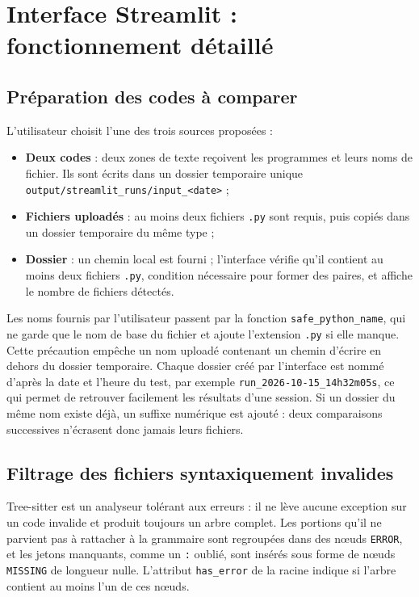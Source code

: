 \documentclass[12pt,a4paper,oneside]{report}
\begin{document}
\chapter{Interface Streamlit : fonctionnement détaillé}
\label{chap:streamlit}

\section{Préparation des codes à comparer}

L'utilisateur choisit l'une des trois sources proposées :
\begin{itemize}
  \item \textbf{Deux codes} : deux zones de texte reçoivent les programmes et
        leurs noms de fichier. Ils sont écrits dans un dossier temporaire
        unique \texttt{output/streamlit\_runs/input\_<date>} ;
  \item \textbf{Fichiers uploadés} : au moins deux fichiers \texttt{.py} sont
        requis, puis copiés dans un dossier temporaire du même type ;
  \item \textbf{Dossier} : un chemin local est fourni ; l'interface vérifie
        qu'il contient au moins deux fichiers \texttt{.py}, condition
        nécessaire pour former des paires, et affiche le nombre de fichiers
        détectés.
\end{itemize}

Les noms fournis par l'utilisateur passent par la fonction
\texttt{safe\_python\_name}, qui ne garde que le nom de base du fichier et
ajoute l'extension \texttt{.py} si elle manque. Cette précaution empêche un nom
uploadé contenant un chemin d'écrire en dehors du dossier temporaire.
Chaque dossier créé par l'interface est nommé d'après la date et l'heure du
test, par exemple \texttt{run\_2026-10-15\_14h32m05s}, ce qui permet de
retrouver facilement les résultats d'une session. Si un dossier du même nom
existe déjà, un suffixe numérique est ajouté : deux comparaisons successives
n'écrasent donc jamais leurs fichiers.

\section{Filtrage des fichiers syntaxiquement invalides}
\label{sec:filtrage}

Tree-sitter est un analyseur tolérant aux erreurs : il ne lève aucune
exception sur un code invalide et produit toujours un arbre complet. Les
portions qu'il ne parvient pas à rattacher à la grammaire sont regroupées
dans des nœuds \texttt{ERROR}, et les jetons manquants, comme un
\og \texttt{:} \fg{} oublié, sont insérés sous forme de nœuds
\texttt{MISSING} de longueur nulle. L'attribut \texttt{has\_error} de la
racine indique si l'arbre contient au moins l'un de ces nœuds.
\end{document}
